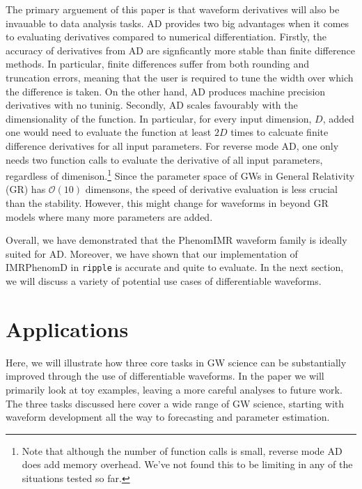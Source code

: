 \documentclass[twocolumn]{aastex631}
\newcommand{\ripple}{\texttt{ripple}\xspace}
\begin{document}
The primary arguement of this paper is that waveform derivatives will also be invauable to data analysis tasks. 
AD provides two big advantages when it comes to evaluating derivatives compared to numerical differentiation.
Firstly, the accuracy of derivatives from AD are signficantly more stable than finite difference methods.
In particular, finite differences suffer from both rounding and truncation errors, meaning that the user is required to tune the width over which the difference is taken.
On the other hand, AD produces machine precision derivatives with no tuninig.
Secondly, AD scales favourably with the dimensionality of the function.
In particular, for every input dimension, $D$, added one would need to evaluate the function at least $2D$ times to calcuate finite difference derivatives for all input parameters.
For reverse mode AD, one only needs two function calls to evaluate the derivative of all input parameters, regardless of dimenison.\footnote{
    Note that although the number of function calls is small, reverse mode AD does add memory overhead.
    We've not found this to be limiting in any of the situations tested so far.
}
Since the parameter space of GWs in General Relativity (GR) has $\mathcal{O}(10)$ dimensons, the speed of derivative evaluation is less crucial than the stability.
However, this might change for waveforms in beyond GR models where many more parameters are added.

Overall, we have demonstrated that the PhenomIMR waveform family is ideally suited for AD.
Moreover, we have shown that our implementation of IMRPhenomD in \ripple is accurate and quite to evaluate.
In the next section, we will discuss a variety of potential use cases of differentiable waveforms.


\section{Applications}
\label{sec:applications}

Here, we will illustrate how three core tasks in GW science can be substantially improved through the use of differentiable waveforms.
In the paper we will primarily look at toy examples, leaving a more careful analyses to future work. 
The three tasks discussed here cover a wide range of GW science, starting with waveform development all the way to forecasting and parameter estimation.
\end{document}
